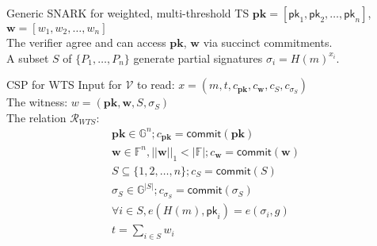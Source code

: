 \begin{frame}{Generic SNARK for weighted, multi-threshold TS}
    $\mathbf{pk} = [\mathsf{pk}_1, \mathsf{pk}_2,\dots, \mathsf{pk}_n]$, $\mathbf{w} = [w_1, w_2, \dots, w_n]$ \\
    The verifier agree and can access $\mathbf{pk}$, $\mathbf{w}$ via succinct commitments. \\ \pause
    \vspace{0.5em}
    A subset $S$ of $\{P_1, \dots, P_n\}$ generate partial signatures $\sigma_i = H(m)^{x_i}$. \\ \pause
    
    \begin{block}{CSP for WTS}
    Input for $\mathcal{V}$ to read: $x = (m, t, c_{\mathbf{pk}}, c_{\mathbf{w}}, c_{S}, c_{\sigma_{S}})$ \\
    The witness: $w = (\mathbf{pk}, \mathbf{w}, S, \sigma_S)$ \\
    The relation $\mathcal{R}_{WTS}$: 
    \begin{equation*}
        \begin{matrix}
            \mathbf{pk}\in \mathbb{G}^n; c_{\mathbf{pk}} = \mathsf{commit}(\mathbf{pk})\\
            \mathbf{w}\in \mathbb{F}^n, ||\mathbf{w}||_1<|\mathbb{F}|;  c_{\mathbf{w}} = \mathsf{commit}(\mathbf{w})\\
            S\subseteq \{1,2,\dots, n\}; c_{S} = \mathsf{commit}(S)\\
            \sigma_{S} \in \mathbb{G}^{|S|} ;c_{\sigma_{S}} = \mathsf{commit}(\sigma_S) \\
            \forall i\in S, e(H(m), \mathsf{pk}_i) = e(\sigma_i, g) \\
            t = \sum_{i\in S} w_i  \\
        \end{matrix}
    \end{equation*}
    \end{block}
    
    \end{frame}




